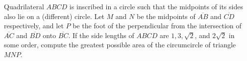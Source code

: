 Quadrilateral $A B C D$ is inscribed in a circle such that the midpoints of its sides also lie on a (different) circle. Let $M$ and $N$ be the midpoints of $\overline{A B}$ and $\overline{C D}$ respectively, and let $P$ be the foot of the perpendicular from the intersection of $\overline{A C}$ and $\overline{B D}$ onto $\overline{B C}$. If the side lengths of $A B C D$ are $1,3, \sqrt{2}$, and $2 \sqrt{2}$ in some order, compute the greatest possible area of the circumcircle of triangle $M N P$.